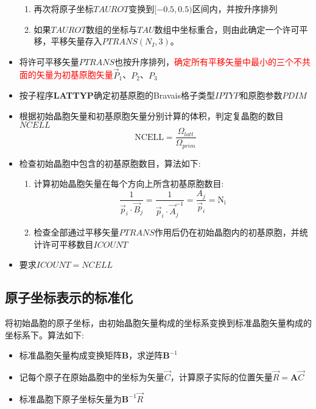 \begin{itemize}
\begin{enumerate}
			\item 再次将原子坐标$\mathit{TAUROT}$变换到$[-0.5,0.5)$区间内，并按升序排列
			\item 如果$\mathit{TAUROT}$数组的坐标与$\mathit{TAU}$数组中坐标重合，则由此确定一个许可平移，平移矢量存入$\mathit{PTRANS}(N_I,3)$。
		\end{enumerate}
	\item 将许可平移矢量$\mathit{PTRANS}$也按升序排列，\textcolor{red}{确定所有平移矢量中最小的三个不共面的矢量为初基原胞矢量}$\vec P_1$、$P_2$、$P_3$
	\item 按子程序\textbf{LATTYP}确定初基原胞的\textrm{Bravais}格子类型$\mathit{IPTYP}$和原胞参数$\mathit{PDIM}$
        \item 根据初始晶胞矢量和初基原胞矢量分别计算的体积，判定复晶胞的数目$\mathit{NCELL}$
\begin{displaymath}
	\mathrm{NCELL}=\dfrac{\Omega_{latt}}{\Omega_{prim}}
\end{displaymath}
	\item 检查初始晶胞中包含的初基原胞数目，算法如下:~
		\begin{enumerate}
			\item 计算初始晶胞矢量在每个方向上所含初基原胞数目:
		\begin{displaymath}
			\dfrac1{\vec p_i\cdot\vec B_j}=\dfrac1{\vec p_i\cdot\vec A_j^{-1}}=\dfrac{A_j}{\vec p_i}=\mathrm{N_{i}}
		\end{displaymath}
	\item 检查全部通过平移矢量$\mathit{PTRANS}$作用后仍在初始晶胞内的初基原胞，并统计许可平移数目$\mathit{ICOUNT}$
		\end{enumerate}
	\item 要求$\mathit{ICOUNT}=\mathit{NCELL}$
\end{itemize}

\subsection{原子坐标表示的标准化}
将初始晶胞的原子坐标，由初始晶胞矢量构成的坐标系变换到标准晶胞矢量构成的坐标系下。算法如下:~
\begin{itemize}
	\item 标准晶胞矢量构成变换矩阵$\mathbf B$，求逆阵$\mathbf{B}^{-1}$
	\item 记每个原子在原始晶胞中的坐标为矢量$\vec C$，计算原子实际的位置矢量$\vec R=\mathbf{A}\vec C$
	\item 标准晶胞下原子坐标矢量为$\mathbf{B}^{-1}\vec R$
\end{itemize}

